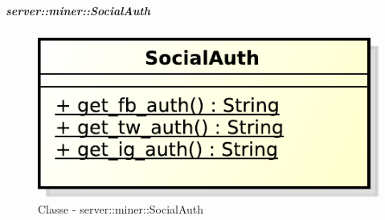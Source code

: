 		\subparagraph{server::miner::SocialAuth} %
		\label{subp:server_miner_SocialAuth}
		    \begin{figure}[!htbp]
 		 		\centering
 				\centerline{\includegraphics[scale=0.75]{./images/server/classes/miner/social_auth.pdf}}
 				\caption{Classe - server::miner::SocialAuth}
			\end{figure}
